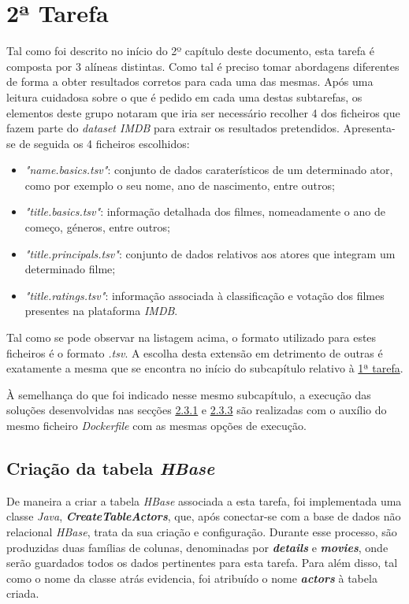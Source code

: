 \documentclass[a4paper]{report}
\begin{document}
{	\section{2ª Tarefa} \label{sec:Task2}
	Tal como foi descrito no início do 2º capítulo deste documento, esta tarefa é composta por 3 alíneas distintas. Como tal é preciso tomar abordagens diferentes de forma a obter resultados corretos para cada uma das mesmas. 
	Após uma leitura cuidadosa sobre o que é pedido em cada uma destas subtarefas, os elementos deste grupo notaram que iria ser necessário recolher 4 dos ficheiros que fazem parte do \textit{dataset IMDB} para extrair os resultados pretendidos.
	Apresenta-se de seguida os 4 ficheiros escolhidos:
	\begin{itemize}
		\item \textit{"name.basics.tsv"}: conjunto de dados caraterísticos de um determinado ator, como por exemplo o seu nome, ano de nascimento, entre outros;
		\item \textit{"title.basics.tsv"}: informação detalhada dos filmes, nomeadamente o ano de começo, géneros, entre outros;
		\item \textit{"title.principals.tsv"}: conjunto de dados relativos aos atores que integram um determinado filme;
		\item \textit{"title.ratings.tsv"}: informação associada à classificação e votação dos filmes presentes na plataforma \textit{IMDB}.
	\end{itemize}
	
	Tal como se pode observar na listagem acima, o formato utilizado para estes ficheiros é o formato \textit{.tsv}. A escolha desta extensão em detrimento de outras é exatamente a mesma que se encontra no início do subcapítulo relativo à \hyperref[sec:Task1]{1ª tarefa}.
	
	À semelhança do que foi indicado nesse mesmo subcapítulo, a execução das soluções desenvolvidas nas secções \hyperref[subsec:Task2-1]{2.3.1} e \hyperref[subsec:Task2-3]{2.3.3} são realizadas com o auxílio do mesmo ficheiro \textit{Dockerfile} com as mesmas opções de execução.
		
		\subsection{Criação da tabela \textit{HBase}} \label{subsec:Task2-1}
		De maneira a criar a tabela \textit{HBase} associada a esta tarefa, foi implementada uma classe \textit{Java}, \textbf{\textit{CreateTableActors}}, que, após conectar-se com a base de dados não relacional \textit{HBase}, trata da sua criação e configuração.
		Durante esse processo, são produzidas duas famílias de colunas, denominadas por \textbf{\textit{details}} e \textbf{\textit{movies}}, onde serão guardados todos os dados pertinentes para esta tarefa. Para além disso, tal como o nome da classe atrás evidencia, foi atribuído o nome \textbf{\textit{actors}} à tabela criada.

}
\end{document}
